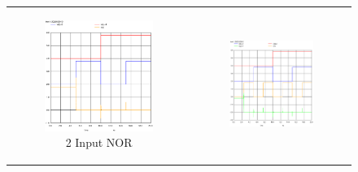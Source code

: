 \documentclass[conference]{IEEEtran}
\begin{document}
\begin{figure}[H]
    \centering
    \begin{tabular}{cc}
        \begin{subfigure}{0.44\linewidth}
            \centering
            \includegraphics[width=\textwidth]{images/nor_cmos_tran.eps}
            \caption{2 Input NOR}
        \end{subfigure} &
        \begin{subfigure}{0.44\linewidth}
            \centering
            \includegraphics[width=\textwidth]{images/nor_3_cmos_tran.eps}

\end{subfigure}
\end{tabular}
\end{figure}
\end{document}
